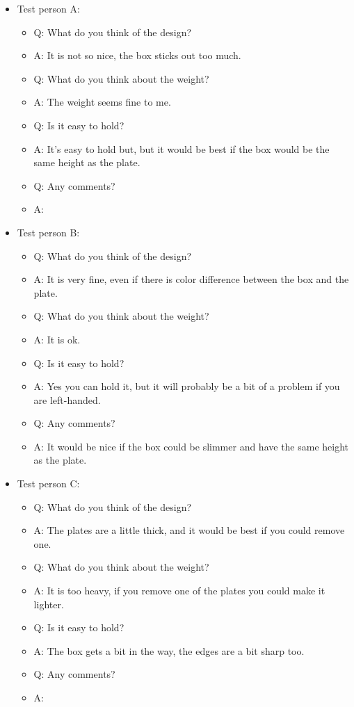 \begin{itemize}
	\item Test person A:
		\begin{itemize} \itemsep0em
	  		\item Q: What do you think of the design?
	  		\item A: It is not so nice, the box sticks out too much.
	  		\item Q: What do you think about the weight?
			\item A: The weight seems fine to me.
			\item Q: Is it easy to hold?
			\item A: It's easy to hold but, but it would be best if the box would be the same height as the plate.
			\item Q: Any comments?
			\item A: 
		\end{itemize}

	\item Test person B:
		\begin{itemize} \itemsep0em
			\item Q: What do you think of the design?
			\item A: It is very fine, even if there is color difference between the box and the plate.
			\item Q: What do you think about the weight?
			\item A: It is ok.
			\item Q: Is it easy to hold?
			\item A: Yes you can hold it, but it will probably be a bit of a problem if you are left-handed.
			\item Q: Any comments?
			\item A: It would be nice if the box could be slimmer and have the same height as the plate.
		\end{itemize}

		\vspace{5mm}

	\item Test person C:
		\begin{itemize} \itemsep0em
			\item Q: What do you think of the design?
			\item A: The plates are a little thick, and it would be best if you could remove one.
			\item Q: What do you think about the weight?
			\item A: It is too heavy, if you remove one of the plates you could make it lighter.
			\item Q: Is it easy to hold?
			\item A: The box gets a bit in the way, the edges are a bit sharp too.
			\item Q: Any comments?
			\item A: 
		\end{itemize}


\end{itemize}

